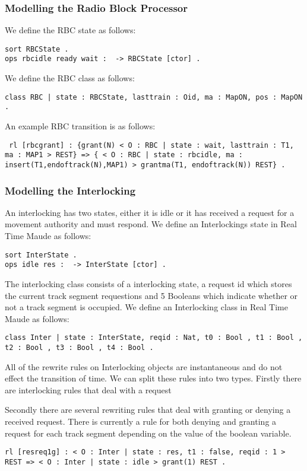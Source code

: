 \subsubsection*{Modelling the Radio Block Processor}
We define the RBC state as follows:

\begin{verbatim}
sort RBCState .
ops rbcidle ready wait :  -> RBCState [ctor] .
\end{verbatim}

We define the RBC class as follows:

\begin{center}
\texttt{class RBC | state : RBCState, lasttrain : Oid, ma : MapON, pos : MapON .}
\end{center}

An example RBC transition is as follows:
\begin{center}
\texttt{ rl [rbcgrant] : \{grant(N) < O : RBC | state : wait, lasttrain : T1, ma : MAP1  > REST\} => \{ < O : RBC | state : rbcidle, ma : insert(T1,endoftrack(N),MAP1) > grantma(T1, endoftrack(N)) REST\} .
}
\end{center}


\subsubsection*{Modelling the Interlocking}
An interlocking has two states, either it is idle or it has received a request for a movement authority and must respond. We define an Interlockings state in Real Time Maude as follows:

\begin{verbatim}
sort InterState .
ops idle res :  -> InterState [ctor] .
\end{verbatim}
The interlocking class consists of a interlocking state, a request id which stores the current track segment requestions and 5 Booleans which indicate whether or not a track segment is occupied. We define an Interlocking class in Real Time Maude as follows:
\begin{center}  
\texttt{class Inter | state : InterState, reqid : Nat, t0 : Bool , t1 : Bool , t2 : Bool , t3 : Bool , t4 : Bool .}
\end{center}

All of the rewrite rules on Interlocking objects are instantaneous and do not effect the transition of time.  We can split these rules into two types. Firstly there are interlocking rules that deal with a request


Secondly there are several rewriting rules that deal with granting or denying a received request. There is currently a rule for both denying and granting a request for each track segment depending on the value of the boolean variable.
\begin{center}
\texttt{rl [resreq1g] : {< O : Inter | state : res, t1 : false,  reqid : 1 > REST} => {< O : Inter | state : idle > grant(1) REST} .}
\end{center}


